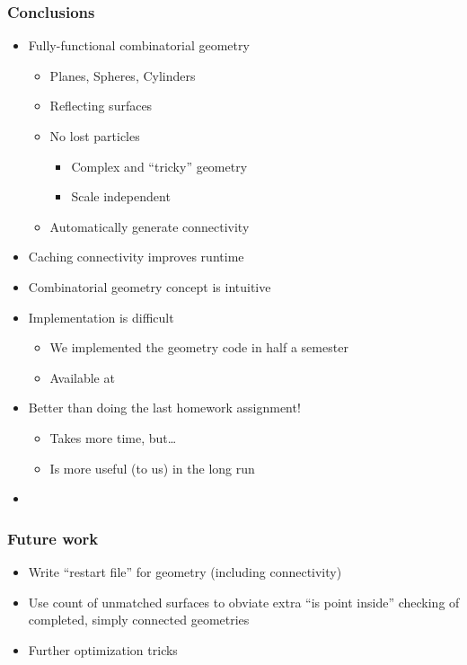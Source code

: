 \documentclass[color={usenames, dvipsnames},ignorenonframetext]{beamer}
\begin{document}
\begin{frame}
  \frametitle{Conclusions}
  \begin{itemize}
    \item<1-> Fully-functional combinatorial geometry
        \begin{itemize}
            \item Planes, Spheres, Cylinders
            \item Reflecting surfaces
            \item No lost particles
                \begin{itemize}
                    \item Complex and ``tricky'' geometry
                    \item Scale independent
                \end{itemize}
            \item Automatically generate connectivity
        \end{itemize}
    \item<2-> Caching connectivity improves runtime
   
    \item<3-> Combinatorial geometry concept is intuitive
    \item<4-> Implementation is difficult
        \begin{itemize}
            \item We implemented the geometry code in half a semester
            \item Available at \color{blue}{http://code.google.com/p/mcgeometry}
        \end{itemize}
     \item<5-> Better than doing the last homework assignment!
         \begin{itemize}
             \item Takes more time, but\dots
             \item Is more useful (to us) in the long run
         \end{itemize}
     \item<6-> \color{red}{We deserve an A}
  \end{itemize}
\end{frame}

\begin{frame}
  \frametitle{Future work}
  \begin{itemize}
	 \item Write ``restart file'' for geometry (including connectivity)
   \item Use count of unmatched surfaces to obviate extra ``is point inside''
     checking of completed, simply connected geometries
   \item Further optimization tricks
  \end{itemize}
\end{frame}

\end{document}
